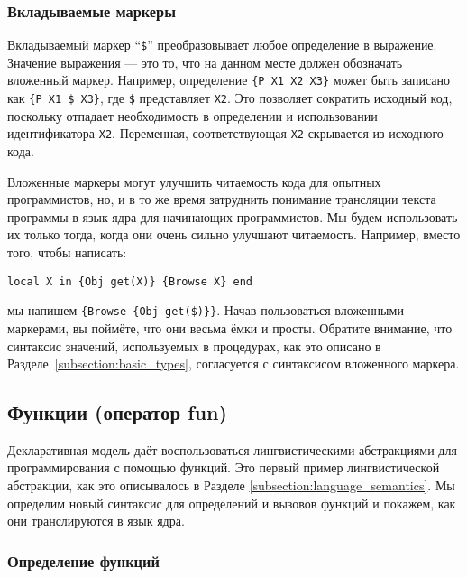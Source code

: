 \subsubsection{Вкладываемые маркеры}

Вкладываемый маркер ``\lstinline[mathescape=false]|$|'' преобразовывает любое определение в выражение. Значение выражения --- это то, что на данном месте должен обозначать вложенный маркер. Например, определение \lstinline|{P X1 X2 X3}| может быть записано как \lstinline[mathescape=false]|{P X1 $ X3}|, где \lstinline[mathescape=false]|$|  представляет \lstinline|X2|. Это позволяет сократить исходный код, поскольку отпадает необходимость в определении и использовании идентификатора \lstinline|X2|. Переменная, соответствующая \lstinline|X2| скрывается из исходного кода.

Вложенные маркеры могут улучшить читаемость кода для опытных программистов, но, и в то же время затруднить понимание трансляции текста программы в язык ядра для начинающих программистов. Мы будем использовать их только тогда, когда они очень сильно улучшают читаемость. Например, вместо того, чтобы написать:

\begin{lstlisting}
local X in {Obj get(X)} {Browse X} end
\end{lstlisting}

мы напишем \lstinline[mathescape=false]|{Browse {Obj get($)}}|. Начав пользоваться вложенными маркерами, вы поймёте, что они весьма ёмки и просты. Обратите внимание, что синтаксис значений, используемых в процедурах, как это описано в Разделе~\ref{subsection:basic_types}, согласуется с синтаксисом вложенного маркера.

\subsection{Функции (оператор fun)}\label{subsection:functions_fun_statement}

Декларативная модель даёт воспользоваться лингвистическими абстракциями для программирования с помощью функций. Это первый пример лингвистической абстракции, как это описывалось в Разделе \ref{subsection:language_semantics}. Мы определим новый синтаксис для определений и вызовов функций и покажем, как они транслируются в язык ядра.

\subsubsection{Определение функций}

